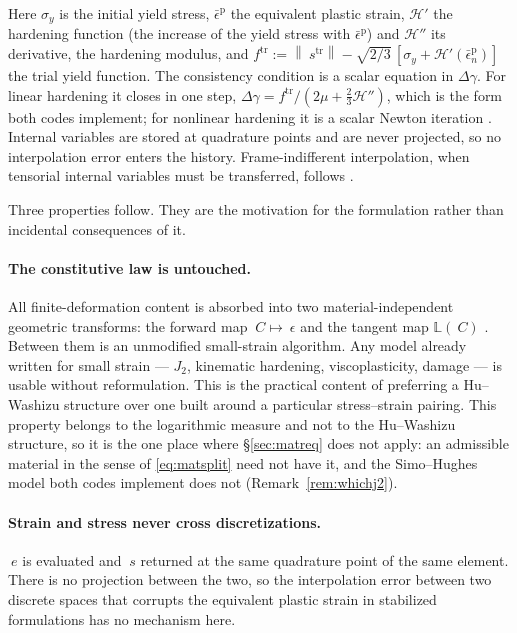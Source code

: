 \documentclass[11pt]{article}
\newcommand{\C}{~C}
\newcommand{\eps}{~\epsilon}
\newcommand{\edev}{~e}
\newcommand{\sdev}{~s}
\newcommand{\norm}[1]{\left\lVert #1 \right\rVert}
\theoremstyle{definition}
\theoremstyle{plain}
\begin{document}
Here $\sigma_y$ is the initial yield stress, $\bar\epsilon^{\mathrm p}$ the
equivalent plastic strain, $\mathcal{H}'$ the hardening function (the increase
of the yield stress with $\bar\epsilon^{\mathrm p}$) and $\mathcal{H}''$ its
derivative, the hardening modulus, and
$f^{\mathrm{tr}} := \norm{\sdev^{\mathrm{tr}}} - \sqrt{2/3}\,[\sigma_y +
\mathcal{H}'(\bar\epsilon^{\mathrm p}_n)]$ the trial yield function. The
consistency condition is a scalar equation in $\Delta\gamma$. For linear
hardening it closes in one step,
$\Delta\gamma = f^{\mathrm{tr}}/(2\mu + \tfrac23\mathcal{H}'')$, which is the
form both codes implement; for nonlinear hardening it is a scalar Newton
iteration \citep[BOX~3.2]{SimoHughes:1998}. Internal variables are stored at quadrature points and
are never projected, so no interpolation error enters the history. Frame-indifferent interpolation, when
tensorial internal variables must be transferred, follows
\citet{Mota.etal:2013}.

Three properties follow. They are the motivation for the formulation rather
than incidental consequences of it.

\paragraph{The constitutive law is untouched.} All finite-deformation content is
absorbed into two material-independent geometric transforms: the forward
map $\C \mapsto \eps$ and the tangent map $\mathbb{L}(\C)$
\citep{Miehe.Apel.Lambrecht:2002}. Between them is an unmodified small-strain
algorithm. Any model already written for small strain --- $J_2$, kinematic
hardening, viscoplasticity, damage --- is usable without reformulation. This is the
practical content of preferring a Hu--Washizu structure over one built around a
particular stress--strain pairing. This property belongs to the
logarithmic measure and not to the Hu--Washizu structure, so it is the one
place where \S\ref{sec:matreq} does not apply: an admissible material
in the sense of \eqref{eq:matsplit} need not have it, and the Simo--Hughes
model both codes implement does not (Remark~\ref{rem:whichj2}).

\paragraph{Strain and stress never cross discretizations.} $\edev$ is evaluated and
$\sdev$ returned at the same quadrature point of the same element. There is no
projection between the two, so the interpolation error between two discrete
spaces that corrupts the equivalent plastic strain in stabilized formulations
has no mechanism here.
\end{document}
